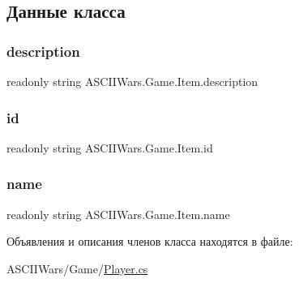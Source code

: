 \subsection{Данные класса}
\hypertarget{class_a_s_c_i_i_wars_1_1_game_1_1_item_a6ff41e953ccebc64a8df8f8c434535a0}{}\label{class_a_s_c_i_i_wars_1_1_game_1_1_item_a6ff41e953ccebc64a8df8f8c434535a0} 
\subsubsection{\texorpdfstring{description}{description}}
{\footnotesize\ttfamily readonly string A\+S\+C\+I\+I\+Wars.\+Game.\+Item.\+description}

\hypertarget{class_a_s_c_i_i_wars_1_1_game_1_1_item_a744d51f7684a4e46a1f834f8666db58e}{}\label{class_a_s_c_i_i_wars_1_1_game_1_1_item_a744d51f7684a4e46a1f834f8666db58e} 
\subsubsection{\texorpdfstring{id}{id}}
{\footnotesize\ttfamily readonly string A\+S\+C\+I\+I\+Wars.\+Game.\+Item.\+id}

\hypertarget{class_a_s_c_i_i_wars_1_1_game_1_1_item_a994b9ec5f10c123e4345da159c090091}{}\label{class_a_s_c_i_i_wars_1_1_game_1_1_item_a994b9ec5f10c123e4345da159c090091} 
\subsubsection{\texorpdfstring{name}{name}}
{\footnotesize\ttfamily readonly string A\+S\+C\+I\+I\+Wars.\+Game.\+Item.\+name}



Объявления и описания членов класса находятся в файле\+:\begin{DoxyCompactItemize}
\item 
A\+S\+C\+I\+I\+Wars/\+Game/\hyperlink{_player_8cs}{Player.\+cs}\end{DoxyCompactItemize}
